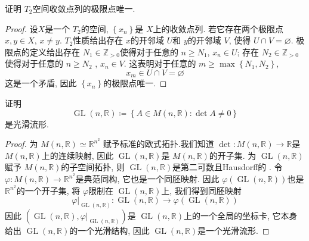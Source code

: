 \documentclass[../main.tex]{subfiles}
\begin{document}
\begin{exercise}{}{}
    证明 \(  T_2  \)空间收敛点列的极限点唯一. 
\end{exercise}
\begin{proof}
    设\( X  \)是一个 \(  T_2  \)的空间,  \(  \left\{ x_{n} \right\}  \)是 \(  X  \)上的收敛点列. 若它存在两个极限点 \(  x,y \in X  \), \(  x\neq y  \). \(  T_2  \)性质给出存在 \(  x  \)的开邻域 \(  U  \)和 \(  y  \)的开邻域 \(  V  \), 使得 \(  U\cap V =  \varnothing\). 极限点的定义给出存在 \(  N_1\in \mathbb{Z} _{> 0}  \)使得对于任意的 \(  n\ge N_1  \), \(  x_{n}\in U  \); 存在 \(  N_2 \in \mathbb{Z} _{> 0}  \)使得对于任意的 \(  n\ge N_2  \)   , \(  x_{n}\in V  \). 这表明对于任意的 \(  m\ge \max \left\{ N_1,N_2 \right\}  \), \[
    x_{m} \in U\cap V= \varnothing
    \]这是一个矛盾, 因此 \(  \left\{ x_{n} \right\}  \)的极限点唯一.   
\end{proof}
\begin{exercise}{}{}
    证明 \[
    \operatorname{GL} \left( n,\mathbb{R}  \right)\coloneqq \left\{ A\in M\left( n,\mathbb{R}  \right):\det A\neq 0  \right\} 
    \]是光滑流形.
\end{exercise}
\begin{proof}
   为 \(  M\left( n,\mathbb{R}  \right)\simeq \mathbb{R} ^{n^{2}}   \) 赋予标准的欧式拓扑.我们知道 \(  \det :M\left( n,\mathbb{R}  \right)\to \mathbb{R}    \)是 \(  M\left( n,\mathbb{R}  \right)   \)上的连续映射, 因此 \(  \operatorname{GL} \left( n,\mathbb{R}  \right)   \)是 \(  M\left( n,\mathbb{R}  \right)   \)的开子集.  为 \(  \operatorname{GL} \left( n,\mathbb{R}  \right)   \)赋予 \(  M\left( n,\mathbb{R}  \right)   \)的子空间拓扑, 则 \(  \operatorname{GL} \left( n,\mathbb{R}  \right)   \)是第二可数且Hausdorff的 . 令 \(   \varphi :M\left( n,\mathbb{R}  \right)\to \mathbb{R} ^{n^{2}}   \)是典范同构, 它也是一个同胚映射. 因此 \(   \varphi \left( \operatorname{GL} \left( n,\mathbb{R}  \right)  \right)   \)也是 \(  \mathbb{R} ^{n^{2}}  \)的一个开子集, 将 \(   \varphi   \)限制在 \(  \operatorname{GL} \left( n,\mathbb{R}  \right)   \)上, 我们得到同胚映射 \[
    \varphi |_{\operatorname{GL} \left( n,\mathbb{R}  \right) }:\operatorname{GL} \left( n,\mathbb{R}  \right)\to  \varphi \left( \operatorname{GL} \left( n,\mathbb{R}  \right)  \right)  
   \]因此 \(  \left( \operatorname{GL} \left( n,\mathbb{R}  \right),  \varphi |_{\operatorname{GL} \left( n,\mathbb{R}  \right) }  \right)   \)是 \(  \operatorname{GL} \left( n,\mathbb{R}  \right)   \)上的一个全局的坐标卡, 它本身给出 \(  \operatorname{GL} \left( n,\mathbb{R}  \right)   \)的一个光滑结构, 因此 \(  \operatorname{GL} \left( n,\mathbb{R}  \right)   \)是一个光滑流形.         
\end{proof}
\end{document}
